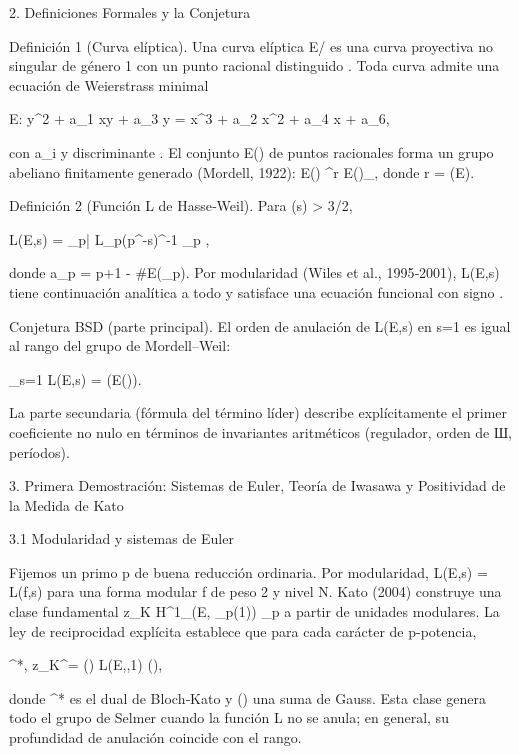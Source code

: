 \documentclass[12pt,a4paper]{book}
\begin{document}
2. Definiciones Formales y la Conjetura

Definición 1 (Curva elíptica). Una curva elíptica E/ es una curva proyectiva no singular de género 1 con un punto racional distinguido . Toda curva admite una ecuación de Weierstrass minimal

E: y^2 + a_1 xy + a_3 y = x^3 + a_2 x^2 + a_4 x + a_6,

con a_i \in {} y discriminante \Delta {}. El conjunto E() de puntos racionales forma un grupo abeliano finitamente generado (Mordell, 1922): E() \cong {}^r \times E()_{}, donde r = (E).

Definición 2 (Función L de Hasse‑Weil). Para \Re(s) > 3/2,

L(E,s) = \prod_{p|\Delta} L_p(p^{-s})^{-1} \prod_{p \nmid \Delta} ,

donde a_p = p+1 - \#E(_p). Por modularidad (Wiles et al., 1995‑2001), L(E,s) tiene continuación analítica a todo  y satisface una ecuación funcional con signo .

Conjetura BSD (parte principal). El orden de anulación de L(E,s) en s=1 es igual al rango del grupo de Mordell–Weil:

_{s=1} L(E,s) = (E()).

La parte secundaria (fórmula del término líder) describe explícitamente el primer coeficiente no nulo en términos de invariantes aritméticos (regulador, orden de Ш, períodos).

3. Primera Demostración: Sistemas de Euler, Teoría de Iwasawa y Positividad de la Medida de Kato

3.1 Modularidad y sistemas de Euler

Fijemos un primo p de buena reducción ordinaria. Por modularidad, L(E,s) = L(f,s) para una forma modular f de peso 2 y nivel N. Kato (2004) construye una clase fundamental z_K \in H^1_{}(E, _p(1)) \otimes {}_p a partir de unidades modulares. La ley de reciprocidad explícita establece que para cada carácter \chi de p-potencia,

\langle \exp^*, z_K^\chi \rangle = \tau(\chi) \cdot L(E,\chi,1) \cdot (),

donde \exp^* es el dual de Bloch‑Kato y \tau(\chi) una suma de Gauss. Esta clase genera todo el grupo de Selmer cuando la función L no se anula; en general, su profundidad de anulación coincide con el rango.
\end{document}

